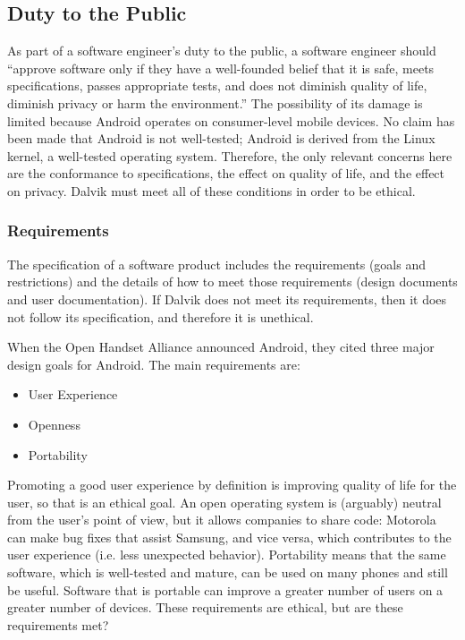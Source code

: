 \documentclass[11pt]{article}
\begin{document}
\begin{multicols}{2}

\subsection{Duty to the Public} %
\label{sub:public}

As part of a software engineer's duty to the public, a software engineer should
``approve software only if they have a well-founded belief that it is safe,
meets specifications, passes appropriate tests, and does not diminish quality of
life, diminish privacy or harm the environment.'' \cite[\S~1.03]{secode}  The
possibility of its damage is limited because Android operates on consumer-level
mobile devices.  No claim has been made that Android is not well-tested; Android
is derived from the Linux kernel, a well-tested operating system.  Therefore,
the only relevant concerns here are the conformance to specifications, the
effect on quality of life, and the effect on privacy.  Dalvik must meet all of
these conditions in order to be ethical.

\subsubsection{Requirements} %
\label{ssub:requirements}

The specification of a software product includes the requirements (goals and
restrictions) and the details of how to meet those requirements (design
documents and user documentation).  If Dalvik does not meet its requirements,
then it does not follow its specification, and therefore it is unethical.

When the Open Handset Alliance announced Android, they cited three major
design goals for Android.  The main requirements are: \cite{open-handset-alliance-ann}

\begin{itemize}
    \item User Experience
    \item Openness
    \item Portability
\end{itemize}

Promoting a good user experience by definition is improving quality of life for
the user, so that is an ethical goal.  An open operating system is (arguably)
neutral from the user's point of view, but it allows companies to share code:
Motorola can make bug fixes that assist Samsung, and vice versa, which
contributes to the user experience (i.e. less unexpected behavior).  Portability
means that the same software, which is well-tested and mature, can be used on
many phones and still be useful.  Software that is portable can improve a
greater number of users on a greater number of devices. These requirements are
ethical, but are these requirements met?


\end{multicols}
\end{document}

